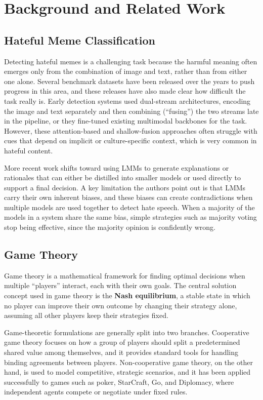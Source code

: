 \documentclass[manuscript,review]{acmart}
\begin{document}
\section{Background and Related Work}

\subsection{Hateful Meme Classification}

Detecting hateful memes is a challenging task because the harmful meaning often emerges
only from the combination of image and text, rather than from either one alone. Several
benchmark datasets have been released over the years to push progress in this area, and
these releases have also made clear how difficult the task really is. Early detection
systems used dual-stream architectures, encoding the image and text separately and then
combining (``fusing'') the two streams late in the pipeline, or they fine-tuned existing
multimodal backbones for the task. However, these attention-based and shallow-fusion
approaches often struggle with cues that depend on implicit or culture-specific context,
which is very common in hateful content.

More recent work shifts toward using LMMs to generate explanations or rationales that
can either be distilled into smaller models or used directly to support a final decision.
A key limitation the authors point out is that LMMs carry their own inherent biases, and
these biases can create contradictions when multiple models are used together to detect
hate speech. When a majority of the models in a system share the same bias, simple
strategies such as majority voting stop being effective, since the majority opinion is
confidently wrong.

\subsection{Game Theory}

Game theory is a mathematical framework for finding optimal decisions when multiple
``players'' interact, each with their own goals. The central solution concept used in
game theory is the \textbf{Nash equilibrium}, a stable state in which no player can improve
their own outcome by changing their strategy alone, assuming all other players keep their
strategies fixed.

Game-theoretic formulations are generally split into two branches. Cooperative game
theory focuses on how a group of players should split a predetermined shared value among
themselves, and it provides standard tools for handling binding agreements between
players. Non-cooperative game theory, on the other hand, is used to model competitive,
strategic scenarios, and it has been applied successfully to games such as poker,
StarCraft, Go, and Diplomacy, where independent agents compete or negotiate under fixed
rules.
\end{document}
